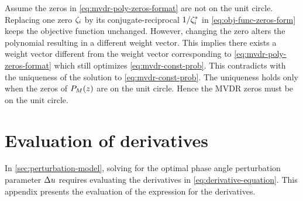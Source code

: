 Assume the zeros in \eqref{eq:mvdr-poly-zeros-format} are not on the
unit circle. Replacing one zero $\zeta_i$ by its conjugate-reciprocal
$1/\zeta_i^*$ in \eqref{eq:obj-func-zeros-form} keeps the objective
function unchanged. However, changing the zero alters the polynomial resulting in a
different weight vector. This implies there exists a weight vector
different from the weight vector corresponding to
\eqref{eq:mvdr-poly-zeros-format} which still optimizes
\eqref{eq:mvdr-const-prob}. This contradicts with the uniqueness of
the solution to \eqref{eq:mvdr-const-prob}. The uniqueness holds only
when the zeros of ${P}_M(z)$ are on the unit circle. Hence the MVDR
zeros must be on the unit circle.

\chapter{Evaluation of derivatives}
\label{app:apdx-derivation}

In \sect{}\ref{sec:perturbation-model}, solving for the optimal phase angle perturbation parameter $\Delta u$ requires evaluating the derivatives in \eqref{eq:derivative-equation}. This appendix presents the evaluation of the expression for the derivatives.

